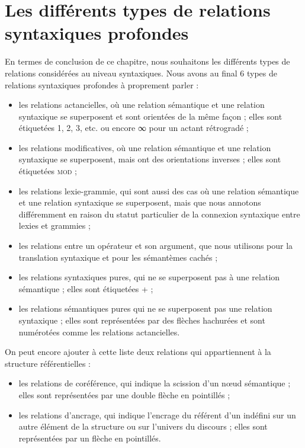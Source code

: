 \section{Les différents types de relations syntaxiques profondes}
En termes de conclusion de ce chapitre, nous souhaitons les différents types de relations considérées au niveau syntaxiques. Nous avons au final 6 types de relations syntaxiques profondes à proprement parler :

\begin{itemize}
\item	les relations actancielles, où une relation sémantique et une relation syntaxique se superposent et sont orientées de la même façon ; elles sont étiquetées 1, 2, 3, etc. ou encore ∞ pour un actant rétrogradé ;
\item	les relations modificatives, où une relation sémantique et une relation syntaxique se superposent, mais ont des orientations inverses ; elles sont étiquetées \textsc{mod} ;
\item	les relations lexie-grammie, qui sont aussi des cas où une relation sémantique et une relation syntaxique se superposent, mais que nous annotons différemment en raison du statut particulier de la connexion syntaxique entre lexies et grammies ;
\item	les relations entre un opérateur et son argument, que nous utilisons pour la translation syntaxique et pour les sémantèmes cachés ;
\item	les relations syntaxiques pures, qui ne se superposent pas à une relation sémantique ; elles sont étiquetées + ;
\item	les relations sémantiques pures qui ne se superposent pas une relation syntaxique ; elles sont représentées par des flèches hachurées et sont numérotées comme les relations actancielles.
\end{itemize}

On peut encore ajouter à cette liste deux relations qui appartiennent à la structure référentielles :

\begin{itemize}
\item	les relations de coréférence, qui indique la scission d’un nœud sémantique ; elles sont représentées par une double flèche en pointillés ;
\item	les relations d’ancrage, qui indique l’encrage du référent d’un indéfini sur un autre élément de la structure ou sur l’univers du discours ; elles sont représentées par un flèche en pointillés.
\end{itemize}

